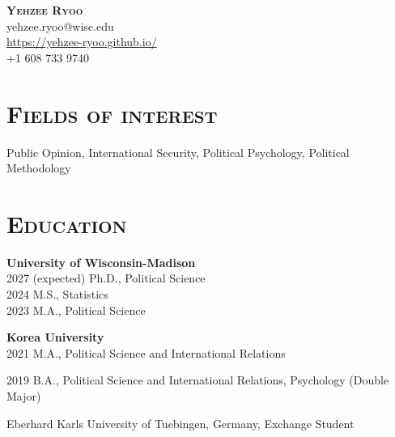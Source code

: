 \documentclass[11pt, letterpaper]{article}
\begin{document}

\setlength{\parskip}{0.1em} 

\begin{center}

{\LARGE \textbf{\textsc{Yehzee Ryoo}}} \\
\raggedleft\footnotesize{yehzee.ryoo@wisc.edu \\\href{https://yehzee-ryoo.github.io/}{https://yehzee-ryoo.github.io/}\\ +1 608 733 9740} \\ %
% 
\end{center}

\vspace{-10mm}

\setlength{\parskip}{-.1em} 
\section*{\textsc{Fields of interest}}
\vspace{-1mm}
Public Opinion, International Security, Political Psychology, Political Methodology

\vspace{-4mm}
\section*{\textsc{Education}}
\vspace{-1mm}
\textbf{University of Wisconsin-Madison}\\
2027 \hspace{.5cm} (expected) Ph.D., Political Science \\
2024 \hspace{.5cm} M.S., Statistics  \\ 
2023 \hspace{.5cm} M.A., Political Science

\vspace{.5mm}
\textbf{Korea University}\\
2021 \hspace{.5cm} M.A., Political Science and International Relations

2019 \hspace{.5cm} B.A., Political Science and International Relations, Psychology (Double Major)

\hspace{1.5cm} Eberhard Karls University of Tuebingen, Germany, Exchange Student\\
\end{document}
